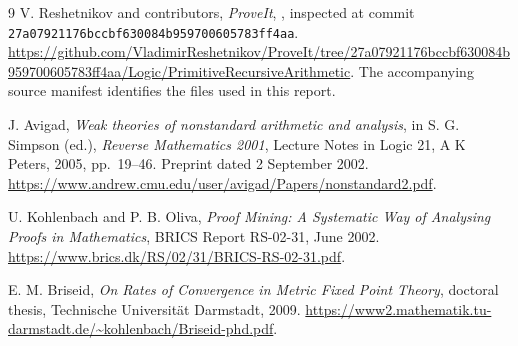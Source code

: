 \documentclass[11pt,oneside]{article}
\theoremstyle{definition}
\theoremstyle{remark}
\begin{document}








\begin{thebibliography}{9}
V. Reshetnikov and contributors, \emph{ProveIt},
, inspected at commit
\texttt{27a07921176bccbf630084b959700605783ff4aa}.
\url{https://github.com/VladimirReshetnikov/ProveIt/tree/27a07921176bccbf630084b959700605783ff4aa/Logic/PrimitiveRecursiveArithmetic}.
The accompanying source manifest identifies the files used in this report.

J. Avigad, \emph{Weak theories of nonstandard arithmetic and analysis},
in S. G. Simpson (ed.), \emph{Reverse Mathematics 2001},
Lecture Notes in Logic 21, A K Peters, 2005, pp.~19--46.
Preprint dated 2 September 2002.
\url{https://www.andrew.cmu.edu/user/avigad/Papers/nonstandard2.pdf}.

U. Kohlenbach and P. B. Oliva,
\emph{Proof Mining: A Systematic Way of Analysing Proofs in Mathematics},
BRICS Report RS-02-31, June 2002.
\url{https://www.brics.dk/RS/02/31/BRICS-RS-02-31.pdf}.

E. M. Briseid, \emph{On Rates of Convergence in Metric Fixed Point Theory},
doctoral thesis, Technische Universit\"at Darmstadt, 2009.
\url{https://www2.mathematik.tu-darmstadt.de/~kohlenbach/Briseid-phd.pdf}.
\end{thebibliography}
\end{document}
